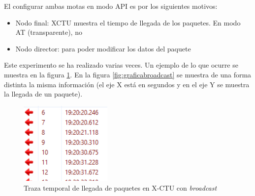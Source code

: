 El configurar ambas motas en modo API es por los siguientes motivos:
\begin{itemize}
  \item Nodo final: XCTU muestra el tiempo de llegada de los paquetes. En modo AT
    (transparente), no
  \item Nodo director: para poder modificar los datos del paquete
\end{itemize}

Este experimento se ha realizado varias veces. Un ejemplo de lo que ocurre se muestra
en la figura \ref{fig:pruebasxctu_broadcast}. En la figura \ref{fig:graficabroadcast}
se muestra de una forma distinta la misma información (el eje X está en segundos y en
el eje Y se muestra la llegada de un paquete).\\

\begin{figure}[!htb]
\centering
\includegraphics[width=0.4\textwidth]{./imagenes/pruebasxctu_broadcast}
\caption{Traza temporal de llegada de paquetes en X-CTU con \textit{broadcast}} \label{fig:pruebasxctu_broadcast}
\end{figure}


